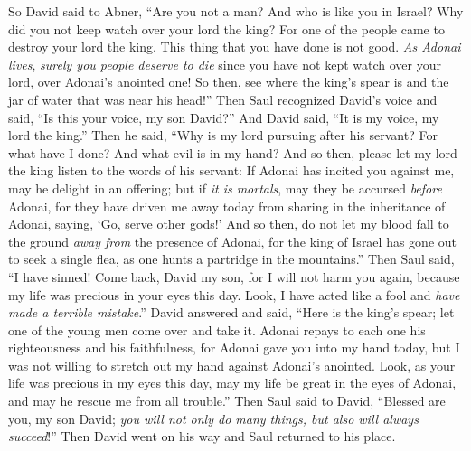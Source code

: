 \begin{biblechapter}
\verse So David said to Abner, “Are you not a man? And who is like you in Israel? Why did you not keep watch over your lord the king? For one of the people came to destroy your lord the king.
\verse This thing that you have done is not good. \textit{As Adonai lives}, \textit{surely you people deserve to die} since you have not kept watch over your lord, over Adonai’s anointed one! So then, see where the king’s spear is and the jar of water that was near his head!”
\verse Then Saul recognized David’s voice and said, “Is this your voice, my son David?” And David said, “It is my voice, my lord the king.”
\verse Then he said, “Why is my lord pursuing after his servant? For what have I done? And what evil is in my hand?
\verse And so then, please let my lord the king listen to the words of his servant: If Adonai has incited you against me, may he delight in an offering; but if \textit{it is mortals}, may they be accursed \textit{before} Adonai, for they have driven me away today from sharing in the inheritance of Adonai, saying, ‘Go, serve other gods!’
\verse And so then, do not let my blood fall to the ground \textit{away from} the presence of Adonai, for the king of Israel has gone out to seek a single flea, as one hunts a partridge in the mountains.”
\verse Then Saul said, “I have sinned! Come back, David my son, for I will not harm you again, because my life was precious in your eyes this day. Look, I have acted like a fool and \textit{have made a terrible mistake}.”
\verse David answered and said, “Here is the king’s spear; let one of the young men come over and take it.
\verse Adonai repays to each one his righteousness and his faithfulness, for Adonai gave you into my hand today, but I was not willing to stretch out my hand against Adonai’s anointed.
\verse Look, as your life was precious in my eyes this day, may my life be great in the eyes of Adonai, and may he rescue me from all trouble.”
\verse Then Saul said to David, “Blessed are you, my son David; \textit{you will not only do many things, but also will always succeed}!” Then David went on his way and Saul returned to his place.
\end{biblechapter}

